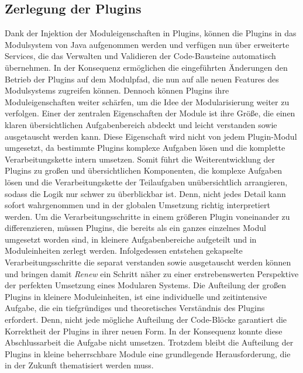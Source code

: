  \subsection*{Zerlegung der Plugins}
	Dank der Injektion der Moduleigenschaften in Plugins, können die Plugins in das Modulsystem von Java aufgenommen werden und verfügen nun über erweiterte Services, die das Verwalten und Validieren der Code-Bausteine automatisch übernehmen. In der Konsequenz ermöglichen die eingeführten Änderungen den Betrieb der Plugins auf dem Modulpfad, die nun auf alle neuen Features des Modulsystems zugreifen können. Dennoch können Plugins ihre Moduleigenschaften weiter schärfen, um die Idee der Modularisierung weiter zu verfolgen. \newline
	Einer der zentralen Eigenschaften der Module ist ihre Größe, die einen klaren übersichtlichen Aufgabenbereich abdeckt und leicht verstanden sowie ausgetauscht werden kann. Diese Eigenschaft wird nicht von jedem Plugin-Modul umgesetzt, da bestimmte Plugins komplexe Aufgaben lösen und die komplette Verarbeitungskette intern umsetzen. Somit führt die Weiterentwicklung der Plugins zu großen und übersichtlichen Komponenten, die komplexe Aufgaben lösen und die Verarbeitungskette der Teilaufgaben unübersichtlich arrangieren, sodass die Logik nur schwer zu überblickbar ist. Denn, nicht jedes Detail kann sofort wahrgenommen und in der globalen Umsetzung richtig interpretiert werden.\newline
	Um die Verarbeitungsschritte in einem größeren Plugin voneinander zu differenzieren, müssen Plugins, die bereits als ein ganzes einzelnes Modul umgesetzt worden sind, in kleinere Aufgabenbereiche aufgeteilt und in Moduleinheiten zerlegt werden. Infolgedessen entstehen gekapselte Verarbeitungsschritte die separat verstanden sowie ausgetauscht werden können und bringen damit  \textit{Renew} ein Schritt näher zu einer erstrebenswerten Perspektive der perfekten Umsetzung eines Modularen Systems. \newline
	Die Aufteilung der großen Plugins in kleinere Moduleinheiten, ist eine individuelle und zeitintensive Aufgabe, die ein tiefgründiges und theoretisches Verständnis des Plugins erfordert. Denn, nicht jede mögliche Aufteilung der Code-Blöcke garantiert die Korrektheit der Plugins in ihrer neuen Form. \newline
	In der Konsequenz konnte diese Abschlussarbeit die Aufgabe nicht umsetzen. Trotzdem bleibt die Aufteilung der Plugins in kleine beherrschbare Module eine grundlegende Herausforderung, die in der Zukunft thematisiert werden muss. 

